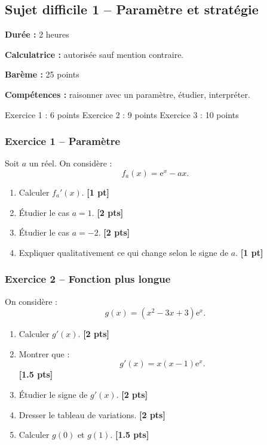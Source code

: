 \documentclass[11pt,a4paper]{article}
\newcommand{\e}{\mathrm{e}}
\newcommand{\pts}[1]{\hfill \textbf{[#1 pt]}}
\newcommand{\ptss}[1]{\hfill \textbf{[#1 pts]}}
\newcommand{\competences}[1]{\textbf{Compétences :} #1}
\newcommand{\calculatrice}{\textbf{Calculatrice :} autorisée sauf mention contraire.}
\newcommand{\duree}[1]{\textbf{Durée :} #1}
\newcommand{\bareme}[1]{\textbf{Barème :} #1}
\begin{document}
\subsection*{Sujet difficile 1 -- Paramètre et stratégie}

\begin{sujetbox}
\duree{2 heures}

\calculatrice

\bareme{25 points}

\competences{raisonner avec un paramètre, étudier, interpréter.}
\end{sujetbox}

\begin{baremebox}
Exercice 1 : 6 points \quad
Exercice 2 : 9 points \quad
Exercice 3 : 10 points
\end{baremebox}

\subsubsection*{Exercice 1 -- Paramètre}

Soit $a$ un réel. On considère :
\[
f_a(x)=\e^x-ax.
\]
\begin{enumerate}
    \item Calculer $f_a'(x)$. \pts{1}
    \item Étudier le cas $a=1$. \ptss{2}
    \item Étudier le cas $a=-2$. \ptss{2}
    \item Expliquer qualitativement ce qui change selon le signe de $a$. \pts{1}
\end{enumerate}

\subsubsection*{Exercice 2 -- Fonction plus longue}

On considère :
\[
g(x)=(x^2-3x+3)\e^x.
\]
\begin{enumerate}
    \item Calculer $g'(x)$. \ptss{2}
    \item Montrer que :
    \[
    g'(x)=x(x-1)\e^x.
    \]
    \ptss{1.5}
    \item Étudier le signe de $g'(x)$. \ptss{2}
    \item Dresser le tableau de variations. \ptss{2}
    \item Calculer $g(0)$ et $g(1)$. \ptss{1.5}
\end{enumerate}
\end{document}
